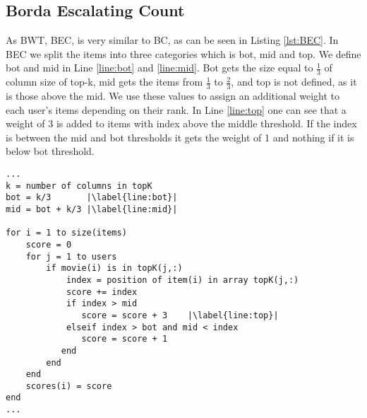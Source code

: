 \subsection{Borda Escalating Count}
As BWT, BEC, is very similar to BC, as can be seen in Listing \ref{lst:BEC}. In BEC we split the items into three categories which is bot, mid and top. We define bot and mid in Line \ref{line:bot} and \ref{line:mid}. Bot gets the size equal to $\frac{1}{3}$ of column size of top-k, mid gets the items from $\frac{1}{3}$ to $\frac{2}{3}$, and top is not defined, as it is those above the mid. We use these values to assign an additional weight to each user's items depending on their rank. In Line \ref{line:top} one can see that a weight of 3 is added to items with index above the middle threshold. If the index is between the mid and bot thresholds it gets the weight of 1 and nothing if it is below bot threshold.
\clearpage
\begin{lstlisting}[caption={Borda Escalating Count implementation},label=lst:BEC, firstnumber=7,escapechar=|]
...
k = number of columns in topK
bot = k/3 		|\label{line:bot}|
mid = bot + k/3	|\label{line:mid}|

for i = 1 to size(items)
	score = 0
	for j = 1 to users
		if movie(i) is in topK(j,:)
			index = position of item(i) in array topK(j,:)
			score += index
			if index > mid			
               score = score + 3	|\label{line:top}|
           	elseif index > bot and mid < index
               score = score + 1
           end 
		end
	end
	scores(i) = score
end
...
\end{lstlisting}